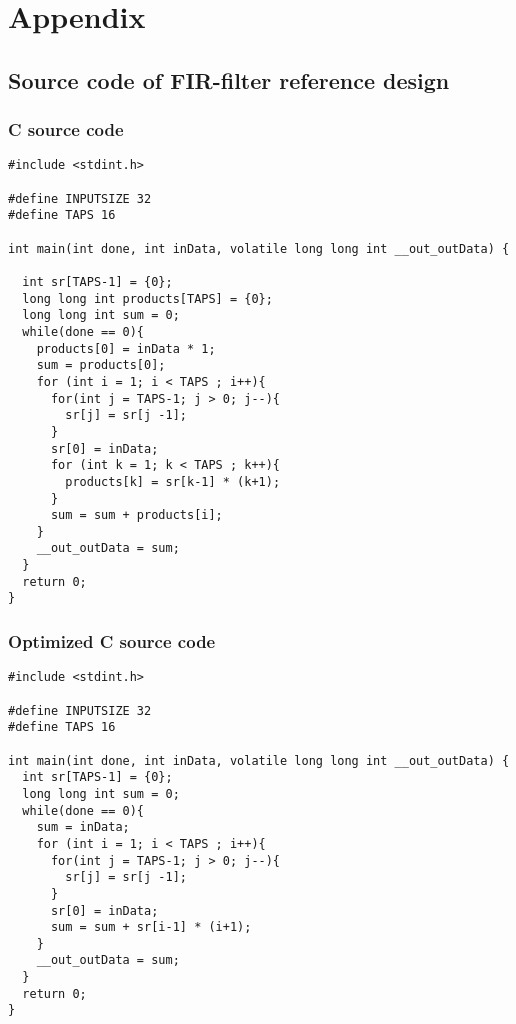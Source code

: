 \chapter{Appendix}
\section{\label{sec:sourcecode}Source code of FIR-filter reference design}
\subsection{\label{subsec:cfircode}C source code}
\lstset{language=C,style=CStyle}
\begin{lstlisting}
#include <stdint.h>

#define INPUTSIZE 32
#define TAPS 16

int main(int done, int inData, volatile long long int __out_outData) {

  int sr[TAPS-1] = {0};
  long long int products[TAPS] = {0};
  long long int sum = 0;
  while(done == 0){
    products[0] = inData * 1;
    sum = products[0];
    for (int i = 1; i < TAPS ; i++){
      for(int j = TAPS-1; j > 0; j--){
        sr[j] = sr[j -1];
      }
      sr[0] = inData;
      for (int k = 1; k < TAPS ; k++){
        products[k] = sr[k-1] * (k+1);
      }
      sum = sum + products[i];
    }
    __out_outData = sum;
  }
  return 0;
}
\end{lstlisting}

\subsection{\label{subsec:cfircode2}Optimized C source code}
\begin{lstlisting}
#include <stdint.h>

#define INPUTSIZE 32
#define TAPS 16

int main(int done, int inData, volatile long long int __out_outData) {
  int sr[TAPS-1] = {0};
  long long int sum = 0;
  while(done == 0){
    sum = inData;
    for (int i = 1; i < TAPS ; i++){
      for(int j = TAPS-1; j > 0; j--){
        sr[j] = sr[j -1];
      }
      sr[0] = inData;
      sum = sum + sr[i-1] * (i+1);
    }
    __out_outData = sum;
  }
  return 0;
}
\end{lstlisting}
